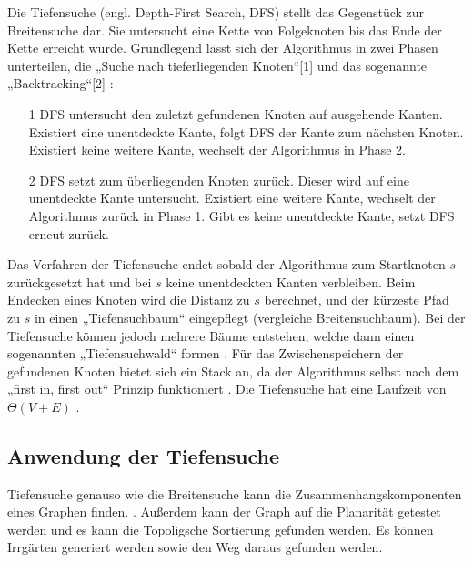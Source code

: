 Die Tiefensuche (engl. Depth-First Search, DFS) stellt das Gegenstück zur Breitensuche dar. Sie untersucht eine Kette von Folgeknoten bis das Ende der Kette erreicht wurde. Grundlegend lässt sich der Algorithmus in zwei Phasen unterteilen, die „Suche nach tieferliegenden Knoten“[1] und das sogenannte „Backtracking“[2] \cite{Tarjan.1972}:
\begin{itemize}
	\item[1] DFS untersucht den zuletzt gefundenen Knoten auf ausgehende Kanten. Existiert eine unentdeckte Kante, folgt DFS der Kante zum nächsten Knoten. Existiert keine weitere Kante, wechselt der Algorithmus in Phase 2.
	\item[2] DFS setzt zum überliegenden Knoten zurück. Dieser wird auf eine unentdeckte Kante untersucht. Existiert eine weitere Kante, wechselt der Algorithmus zurück in Phase 1. Gibt es keine unentdeckte Kante, setzt DFS erneut zurück.
\end{itemize}
Das Verfahren der Tiefensuche endet sobald der Algorithmus zum Startknoten $s$ zurückgesetzt hat und bei $s$ keine unentdeckten Kanten verbleiben. Beim Endecken eines Knoten wird die Distanz zu $s$ berechnet, und der kürzeste Pfad zu $s$ in einen „Tiefensuchbaum“ eingepflegt (vergleiche Breitensuchbaum). Bei der Tiefensuche können jedoch mehrere Bäume entstehen, welche dann einen sogenannten „Tiefensuchwald“ formen \cite{Cormen.2009}. 
Für das Zwischenspeichern der gefundenen Knoten bietet sich ein Stack an, da der Algorithmus selbst nach dem „first in, first out“ Prinzip funktioniert \cite{Tarjan.1972}. Die Tiefensuche hat eine Laufzeit von $\Theta(V + E)$ \cite{Cormen.2009}.


\subsection{Anwendung der Tiefensuche}
Tiefensuche genauso wie die Breitensuche kann die Zusammenhangskomponenten eines Graphen finden. \cite{schmitz} \cite{dfs}. Außerdem kann der Graph auf die Planarität \cite{dfsPlanar} getestet werden und es kann die Topoligsche Sortierung gefunden werden. Es können Irrgärten generiert werden sowie den Weg daraus gefunden werden\cite{examMaze}. %


